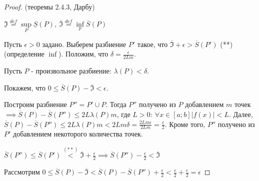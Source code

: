 \documentclass{report}
\theoremstyle{definition}
\begin{document}
\begin{proof}
  (теоремы 2.4.3, Дарбу)

  $\underline{\mathfrak{I}} \overset{def}{=} \underset{P}{\sup}\underline{S}(P), \ \overline{\mathfrak{I}}
  \overset{def}{=} \underset{p}{\inf}\overline{S}(P)$

  Пусть $\epsilon > 0$ задано. Выберем разбиение $P'$ такое, что $\overline{\mathfrak{I}} + \epsilon >
  \overline{S}(P')$ (**) (определение $\inf$). Положим, что $\delta = \frac{\epsilon}{2Lm}$.

  Пусть $P$ - произвольное разбиение: $\lambda (P) < \delta$.

  Покажем, что $0 \leqslant \overline{S}(P) - \overline{\mathfrak{I}} < \epsilon$.

  Построим разбиение $P'' = P' \cup P$. Тогда $P''$ получено из $P$ добавлением $m$ точек $\implies
  \overline{S}(P) - \overline{S}(P'') \leqslant 2L\lambda(P)m$, где $L>0: \ \forall x \in [a;b] | f(x) |
  < L$. Далее, $\overline{S}(P) - \overline{S}(P'')\leqslant2L\lambda(P)m < 2Lm\delta = \frac{2Lm\epsilon}
  {2Lm} = \frac{\epsilon}{2}$. Кроме того, $P''$ получено из $P'$ добавлением некоторого количества точек.
  \begin{center}
    {\large $\overline{S}(P'')\leqslant\overline{S}(P')\overset{(**)}{<} \overline{\mathfrak{I}} + \frac
    {\epsilon}{2}\implies \overline{S}(P'')-\frac{\epsilon}{2}<\overline{\mathfrak{I}}$}
  \end{center}
  Рассмотрим $0\leqslant\overline{S}(P) - \overline{\mathfrak{I}} < \overline{S}(P) - \overline{S}(P'') +
  \frac{\epsilon}{2} < \frac{\epsilon}{2} + \frac{\epsilon}{2} = \epsilon$
\end{proof}
\end{document}

